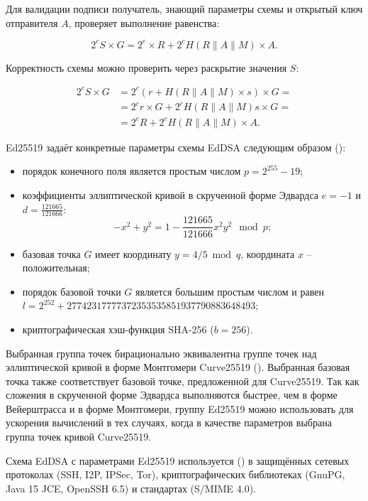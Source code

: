 Для валидации подписи получатель, знающий параметры схемы и открытый ключ отправителя $A$, проверяет выполнение равенства:

\[
	2^c S \times G = 2^c \times R + 2^c H( R \| A \| M ) \times A.
\]

Корректность схемы можно проверить через раскрытие значения $S$:

\[ \begin{array}{ll}
2^c S \times G & = 2^c ( r + H( R \| A \| M ) \times s ) \times G = \\
               & = 2^c r \times G + 2^c H( R \| A \| M ) s \times G = \\
               & = 2^c R + 2^c H( R \| A \| M ) \times A.
\end{array} \]

Ed25519 задаёт конкретные параметры схемы EdDSA следующим образом (\cite{Bernstein:Duif:Lange:Schwabe:Yang:2011}):

\begin{itemize}
	\item порядок конечного поля является простым числом $p = 2^{255}-19$;
	\item коэффициенты эллиптической кривой в скрученной форме Эдвардса $e = -1$ и $d = \frac{121665}{121666}$:
\[
-x^2 + y^2 = 1 - \frac{121665}{121666}x^2y^2 \mod p;
\]
	\item базовая точка $G$ имеет координату $y = 4/5 \bmod q$, координата $x$ -- положительная;
	\item порядок базовой точки $G$ является большим простым числом и равен $l = 2^{252} + 27742317777372353535851937790883648493$;
	\item криптографическая хэш-функция SHA-256 ($b = 256$).
\end{itemize}

Выбранная группа точек бирационально эквивалентна группе точек над эллиптической кривой в форме Монтгомери Curve25519 (\cite{Bernstein:2006}). Выбранная базовая точка также соответствует базовой точке, предложенной для Curve25519. Так как сложения в скрученной форме Эдвардса выполняются быстрее, чем в форме Вейерштрасса и в форме Монтгомери, группу Ed25519 можно использовать для ускорения вычислений в тех случаях, когда в качестве параметров выбрана группа точек кривой Curve25519.

Схема EdDSA с параметрами Ed25519 используется (\cite{IANIX:Ed25519:2021}) в защищённых сетевых протоколах (SSH, I2P, IPSec, Tor), криптографических библиотеках (GnuPG, Java 15 JCE, OpenSSH 6.5) и стандартах (S/MIME 4.0).

